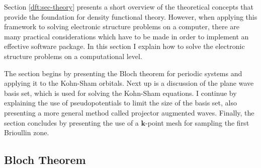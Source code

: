 \begin{refsection}
Section \ref{dft:sec-theory} presents a short overview of the theoretical 
concepts that provide the foundation for density functional theory. However, 
when applying this framework to solving electronic structure problems on a 
computer, there are many practical considerations which have to be made in 
order to implement an effective software package. In this section I explain 
how to solve the electronic structure problems on a computational 
level.  
 
The section begins by presenting the Bloch theorem for periodic systems and applying it 
to the Kohn-Sham orbitals. Next up is a discussion of the plane wave 
basis set, which is used for solving the Kohn-Sham equations.  I continue by 
explaining the use of pseudopotentials to limit the size of the basis set, 
also presenting a more general method called projector augmented waves. 
Finally, the section concludes by presenting the use of a $\mathbf{k}$-point mesh for 
sampling the first Brioullin zone. 
 
\subsection{Bloch Theorem}\label{dft:sec-bloch} 
 

\end{refsection}

